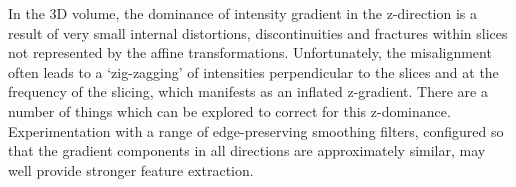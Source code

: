   In the 3D volume, the dominance of intensity gradient in the z-direction is a result of very small internal distortions, discontinuities and fractures within slices not represented by the affine transformations. Unfortunately, the misalignment often leads to a `zig-zagging' of intensities perpendicular to the slices and at the frequency of the slicing, which manifests as an inflated z-gradient. There are a number of things which can be explored to correct for this z-dominance. Experimentation with a range of edge-preserving smoothing filters, configured so that the gradient components in all directions are approximately similar, may well provide stronger feature extraction. 
\label{sec:discussion}
  

